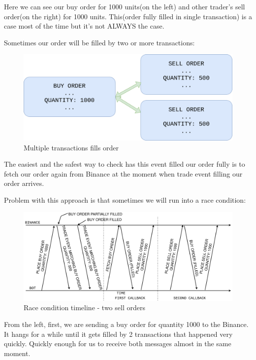 \documentclass[
]{book}
\begin{document}
Here we can see our buy order for 1000 units(on the left) and other trader's sell order(on the right) for 1000 units. This(order fully filled in single transaction) is a case most of the time but it's not ALWAYS the case.

Sometimes our order will be filled by two or more transactions:

\begin{figure}
\centering
\includegraphics{images/chapter_08_02_multiple_transactions_per_order.png}
\caption{Multiple transactions fills order}
\end{figure}

The easiest and the safest way to check has this event filled our order fully is to fetch our order again from Binance at the moment when trade event filling our order arrives.

Problem with this approach is that sometimes we will run into a race condition:

\begin{figure}
\centering
\includegraphics{images/chapter_08_03_race_condition_timeline.png}
\caption{Race condition timeline - two sell orders}
\end{figure}

From the left, first, we are sending a buy order for quantity 1000 to the Binance. It hangs for a while until it gets filled by 2 transactions that happened very quickly. Quickly enough for us to receive both messages almost in the same moment.
\end{document}
